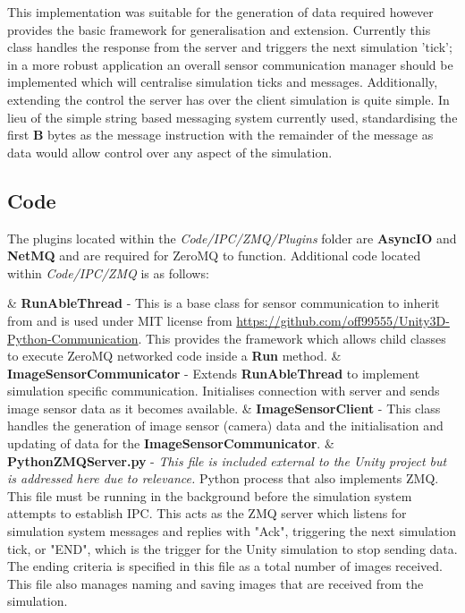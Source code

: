 \documentclass{article}
\begin{document}
This implementation was suitable for the generation of data required however provides the basic framework for generalisation and extension. Currently this class handles the response from the server and triggers the next simulation 'tick'; in a more robust application an overall sensor communication manager should be implemented which will centralise simulation ticks and messages. Additionally, extending the control the server has over the client simulation is quite simple. In lieu of the simple string based messaging system currently used, standardising the first \textbf{B} bytes as the message instruction with the remainder of the message as data would allow control over any aspect of the simulation. 


\subsection{Code}

The plugins located within the \textit{Code/IPC/ZMQ/Plugins} folder are \textbf{AsyncIO} and \textbf{NetMQ} and are required for ZeroMQ to function. Additional code located within \textit{Code/IPC/ZMQ} is as follows:

\begin{easylist}[itemize]
	& \textbf{RunAbleThread} - This is a base class for sensor communication to inherit from and is used under MIT license from \url{https://github.com/off99555/Unity3D-Python-Communication}. This provides the framework which allows child classes to execute ZeroMQ networked code inside a \textbf{Run} method.
	& \textbf{ImageSensorCommunicator} - Extends \textbf{RunAbleThread} to implement simulation specific communication. Initialises connection with server and sends image sensor data as it becomes available.
	& \textbf{ImageSensorClient} - This class handles the generation of image sensor (camera) data and the initialisation and updating of data for the \textbf{ImageSensorCommunicator}.
	& \textbf{PythonZMQServer.py} - \textit{This file is included external to the Unity project but is addressed here due to relevance.} Python process that also implements ZMQ. This file must be running in the background before the simulation system attempts to establish IPC. This acts as the ZMQ server which listens for simulation system messages and replies with "Ack", triggering the next simulation tick, or "END", which is the trigger for the Unity simulation to stop sending data. The ending criteria is specified in this file as a total number of images received. This file also manages naming and saving images that are received from the simulation. 
\end{easylist}
\end{document}
